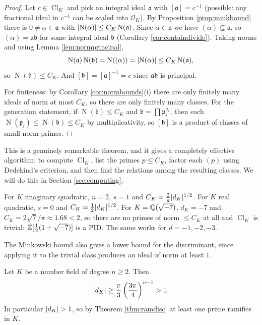 \documentclass[a4paper]{scrartcl}
\renewcommand{\OO}{\mathcal{O}}
\newcommand{\Nm}{\operatorname{N}}
\newcommand{\Cl}{\operatorname{Cl}}
\newcommand{\fa}{\mathfrak{a}}
\newcommand{\fb}{\mathfrak{b}}
\newcommand{\fp}{\mathfrak{p}}
\begin{document}
\begin{proof}
	Let $c \in \Cl_K$ and pick an integral ideal $\fa$ with $[\fa] = c^{-1}$ (possible: any fractional ideal in $c^{-1}$ can be scaled into $\OO_K$). By Proposition \ref{prop:minkbound} there is $0 \neq \alpha\in\fa$ with $\abs{\Nm(\alpha)} \le C_K\Nm(\fa)$. Since $\alpha \in \fa$ we have $(\alpha) \subseteq \fa$, so $(\alpha) = \fa\fb$ for some integral ideal $\fb$ (Corollary \ref{cor:containdivide}). Taking norms and using Lemma \ref{lem:normprincipal},
	$$\Nm(\fa)\Nm(\fb) = \Nm((\alpha)) = \abs{\Nm(\alpha)} \le C_K\Nm(\fa),$$
	so $\Nm(\fb) \le C_K$. And $[\fb] = [\fa]^{-1} = c$ since $\fa\fb$ is principal.

	For finiteness: by Corollary \ref{cor:normbounds}(i) there are only finitely many ideals of norm at most $C_K$, so there are only finitely many classes. For the generation statement, if $\Nm(\fb)\le C_K$ and $\fb = \prod\fp_i^{a_i}$, then each $\Nm(\fp_i) \le \Nm(\fb) \le C_K$ by multiplicativity, so $[\fb]$ is a product of classes of small-norm primes.
\end{proof}

This is a genuinely remarkable theorem, and it gives a completely effective algorithm: to compute $\Cl_K$, list the primes $p \le C_K$, factor each $(p)$ using Dedekind's criterion, and then find the relations among the resulting classes. We will do this in Section \ref{sec:computing}.

\begin{example}
	For $K$ imaginary quadratic, $n=2$, $s=1$ and $C_K = \frac{2}{\pi}\lvert d_K\rvert^{1/2}$. For $K$ real quadratic, $s = 0$ and $C_K = \tfrac12\lvert d_K\rvert^{1/2}$. For $K = \mathbb{Q}(\sqrt{-7})$, $d_K = -7$ and $C_K = 2\sqrt7/\pi \approx 1.68 < 2$, so there are no primes of norm $\le C_K$ at all and $\Cl_K$ is trivial: $\mathbb{Z}[\tfrac12(1+\sqrt{-7})]$ is a PID. The same works for $d = -1,-2,-3$.
\end{example}

The Minkowski bound also gives a lower bound for the discriminant, since applying it to the trivial class produces an ideal of norm at least $1$.

\begin{theorem}\label{thm:hermite}
	Let $K$ be a number field of degree $n \geq 2$. Then
	$$\lvert d_K\rvert \ge \frac{\pi}{3}\left(\frac{3\pi}{4}\right)^{n-1} > 1.$$
	In particular $\lvert d_K\rvert > 1$, so by Theorem \ref{thm:ramdisc} at least one prime ramifies in $K$.
\end{theorem}
\end{document}
